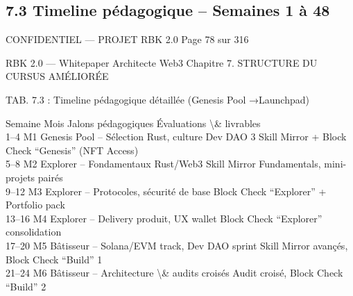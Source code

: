 \subsection{7.3 Timeline pédagogique – Semaines 1 à 48}
\vspace{0.5em}
\vspace{0.5em}
\vspace{0.5em}
\vspace{0.5em}
\begin{confidential}CONFIDENTIEL — PROJET RBK 2.0                                         Page 78 sur 316\end{confidential}
RBK 2.0 — Whitepaper Architecte Web3                                                          Chapitre 7. STRUCTURE DU CURSUS AMÉLIORÉE\\
\vspace{0.5em}
\vspace{0.5em}
\vspace{0.5em}
\vspace{0.5em}
\begin{center}\begin{tabular}TAB. 7.3 : Timeline pédagogique détaillée (Genesis Pool →Launchpad)\end{tabular}\end{center}
\vspace{0.5em}
\vspace{0.5em}
Semaine      Mois     Jalons pédagogiques                                  Évaluations \textbackslash{}& livrables\\
1–4        M1       Genesis Pool – Sélection Rust, culture Dev DAO       3 Skill Mirror + Block Check “Genesis” (NFT Access)\\
5–8        M2       Explorer – Fondamentaux Rust/Web3                    Skill Mirror Fundamentals, mini-projets pairés\\
9–12       M3       Explorer – Protocoles, sécurité de base              Block Check “Explorer” + Portfolio pack\\
13–16       M4       Explorer – Delivery produit, UX wallet               Block Check “Explorer” consolidation\\
17–20       M5       Bâtisseur – Solana/EVM track, Dev DAO sprint         Skill Mirror avançés, Block Check “Build” 1\\
21–24       M6       Bâtisseur – Architecture \textbackslash{}& audits croisés            Audit croisé, Block Check “Build” 2\\
\vspace{0.5em}
